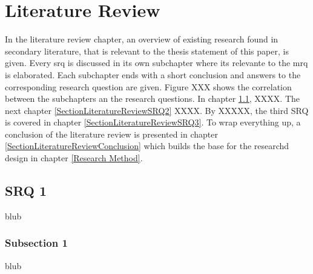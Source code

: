 
\chapter{Literature Review} %

\label{ChapterLiteratureReview} %

In the literature review chapter, an overview of existing research found in secondary literature, that is relevant to the thesis statement of this paper, is given. Every \gls{srq} is discussed in its own subchapter where its relevante to the \gls{mrq} is elaborated. Each subchapter ends with a short conclusion and answers to the corresponding research question are given.
Figure XXX shows the correlation between the subchapters an the research questions. In chapter \ref{SectionLiteratureReviewSRQ1}, XXXX. The next chapter \ref{SectionLiteratureReviewSRQ2} XXXX. By XXXXX, the third SRQ is covered in chapter \ref{SectionLiteratureReviewSRQ3}. To wrap everything up, a conclusion of the literature review is presented in chapter \ref{SectionLiteratureReviewConclusion} which builds the base for the researchd design in chapter \ref{Research Method}.




\section{SRQ 1}

\label{SectionLiteratureReviewSRQ1}

blub


\subsection{Subsection 1}

blub



